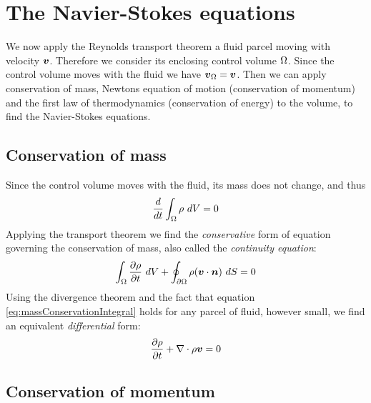 
\section{The Navier-Stokes equations}

We now apply the Reynolds transport theorem a fluid parcel moving with
velocity $\boldsymbol {v}$. Therefore we consider its enclosing control volume
$\Omega$. Since the control volume moves with the fluid we have
$\boldsymbol {v}_{\Omega} = \boldsymbol {v}$. Then we can apply conservation of mass, Newtons
equation of motion (conservation of momentum) and the first law of
thermodynamics (conservation of energy) to the volume, to find the
Navier-Stokes equations.

\subsection{Conservation of mass} 

Since the control volume moves with the fluid, its mass does not
change, and thus
\begin{align*}
  \frac{d}{dt} \int_{\Omega} \rho~dV = 0
\end{align*}
Applying the transport theorem we find the \emph{conservative} form of
equation governing the conservation of mass, also called the
\emph{continuity equation}:
\begin{equation}
  \int_{\Omega} \frac{\partial \rho}{\partial t}~dV + \oint_{{\partial \Omega}} \rho (\boldsymbol {v} \cdot \boldsymbol {n})~dS = 0
  \label{eq:massConservationIntegral}
\end{equation}
Using the divergence theorem and the fact that equation
\ref{eq:massConservationIntegral} holds for any parcel of fluid,
however small, we find an equivalent \emph{differential} form:
\begin{equation}
  \frac{\partial \rho}{\partial t} + \nabla \cdot \rho \boldsymbol {v} = 0
  \label{eq:massConservationDifferential}
\end{equation}

\subsection{Conservation of momentum} 

